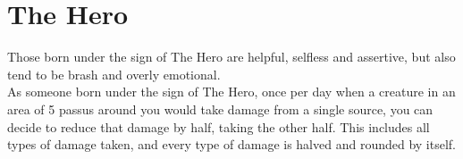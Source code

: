 \section{The Hero}

Those born under the sign of The Hero are helpful, selfless and assertive, but also tend to be brash and overly emotional.\\
As someone born under the sign of The Hero, once per day when a creature in an area of 5 passus around you would take damage from a single source, you can decide to reduce that damage by half, taking the other half. This includes all types of damage taken, and every type of damage is halved and rounded by itself.\\
